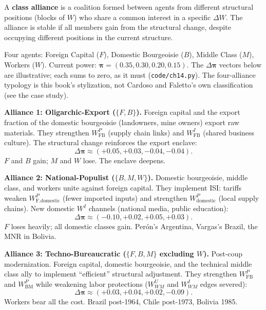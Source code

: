 \documentclass[../structural_economics_book.tex]{subfiles}
\begin{document}
\begin{definition}\label{ch14:def:class_alliance}
A \textbf{class alliance} is a coalition formed between agents from different structural positions (blocks of $W$) who share a common interest in a specific $\Delta W$. The alliance is stable if all members gain from the structural change, despite occupying different positions in the current structure.
\end{definition}

\begin{example}\label{ch14:ex:four_alliances}
Four agents: Foreign Capital ($F$), Domestic Bourgeoisie ($B$), Middle Class ($M$), Workers ($W$). Current power: $\boldsymbol{\pi} = (0.35, 0.30, 0.20, 0.15)$. The $\Delta\boldsymbol{\pi}$ vectors below are illustrative; each sums to zero, as it must (\texttt{code/ch14.py}). The four-alliance typology is this book's stylization, not Cardoso and Faletto's own classification (see the case study).

\textbf{Alliance 1: Oligarchic-Export ($\{F, B\}$).} Foreign capital and the export fraction of the domestic bourgeoisie (landowners, mine owners) export raw materials. They strengthen $W^P_{\text{FB}}$ (supply chain links) and $W^I_{\text{FB}}$ (shared business culture). The structural change reinforces the export enclave:
\begin{equation}
\Delta\boldsymbol{\pi} \approx (+0.05, +0.03, -0.04, -0.04).
\end{equation}
$F$ and $B$ gain; $M$ and $W$ lose. The enclave deepens.

\textbf{Alliance 2: National-Populist ($\{B, M, W\}$).} Domestic bourgeoisie, middle class, and workers unite against foreign capital. They implement ISI: tariffs weaken $W^P_{\text{F,domestic}}$ (fewer imported inputs) and strengthen $W^P_{\text{domestic}}$ (local supply chains). New domestic $W^I$ channels (national media, public education):
\begin{equation}
\Delta\boldsymbol{\pi} \approx (-0.10, +0.02, +0.05, +0.03).
\end{equation}
$F$ loses heavily; all domestic classes gain. Per\'{o}n's Argentina, Vargas's Brazil, the MNR in Bolivia.

\textbf{Alliance 3: Techno-Bureaucratic ($\{F, B, M\}$ excluding $W$).} Post-coup modernization. Foreign capital, domestic bourgeoisie, and the technical middle class ally to implement ``efficient'' structural adjustment. They strengthen $W^P_{\text{FB}}$ and $W^P_{\text{BM}}$ while weakening labor protections ($W^U_{WM}$ and $W^I_{WM}$ edges severed):
\begin{equation}
\Delta\boldsymbol{\pi} \approx (+0.03, +0.04, +0.02, -0.09).
\end{equation}
Workers bear all the cost. Brazil post-1964, Chile post-1973, Bolivia 1985.


\end{example}
\end{document}
